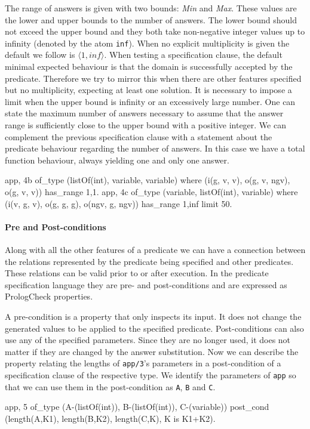 \documentclass[runningheads,a4paper]{../../PaperStyles/llncs}
\newcommand{\yap}[1]{\lstinline[style=yap]{#1}}
\newcommand{\plqc}[0]{{\sf PrologCheck}}
\begin{document}
The range of answers is given with two bounds: \emph{Min} and
\emph{Max}.
%
These values are the lower and upper bounds to the number of answers.
%
The lower bound should not exceed the upper bound and they both take
non-negative integer values up to infinity (denoted by the atom
\yap{inf}).
%
When no explicit multiplicity is given the default we %
follow is
$\langle 1, inf \rangle $.
%
When testing a specification clause, the default minimal expected
behaviour is that the domain is successfully accepted by the predicate.
%
Therefore we try to mirror this when there are other features
specified but no multiplicity, expecting at least one solution.
%
It is necessary to impose a limit when the upper bound is infinity or an
excessively large number.
%
One can state the maximum number of answers necessary to assume that the
answer range is sufficiently close to the upper bound with a positive
integer.
%
We can complement the previous specification clause with a statement
about the predicate behaviour regarding the number of answers.
%
In this case we have a total function behaviour, always yielding one and
only one answer.
%
\begin{yapcode}
 {app, 4b} of_type (listOf(int), variable, variable)
    where (i(g, v, v), o(g, v, ngv), o(g, v, v))
    has_range {1,1}.
 {app, 4c} of_type (variable, listOf(int), variable)
    where (i(v, g, v), o(g, g, g), o(ngv, g, ngv))
    has_range {1,inf} limit 50.
\end{yapcode}

\paragraph{\bf Pre and Post-conditions}

Along with all the other features of a predicate we can have a
connection between the relations represented by the predicate being
specified and other predicates.
%
These relations can be valid prior to or after execution.
%
In the predicate specification language they are pre- and
post-conditions and are expressed as \plqc{} properties.


A pre-condition is a property that only inspects its input.
%
It does not change the generated values to be applied to the specified
predicate.
%
Post-conditions can also use any of the specified parameters.
%
Since they are no longer used, it does not matter if they are changed by
the answer substitution.
%
Now we can describe the property relating the lengths of \yap{app/3}'s
parameters in a post-condition of a specification clause of the
respective type.
%
We identify the parameters of \yap{app} so that we can use them in the
post-condition as \yap{A},  \yap{B} and  \yap{C}.
%
\begin{yapcode}
 {app, 5} of_type (A-(listOf(int)), B-(listOf(int)), C-(variable))
   post_cond (length(A,K1), length(B,K2), length(C,K), K is K1+K2).
\end{yapcode}
\end{document}
